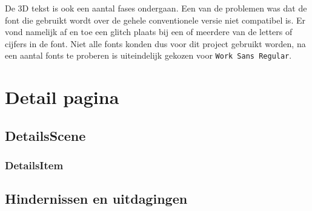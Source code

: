 De 3D tekst is ook een aantal fases ondergaan. Een van de problemen was dat de font die gebruikt wordt over de gehele conventionele versie niet compatibel is. Er vond namelijk af en toe een glitch plaats bij een of meerdere van de letters of cijfers in de font. Niet alle fonts konden dus voor dit project gebruikt worden, na een aantal fonts te proberen is uiteindelijk gekozen voor \texttt{Work Sans Regular}.

\section{Detail pagina}

\subsection{DetailsScene}

\subsubsection{DetailsItem}





\subsection{Hindernissen en uitdagingen}
